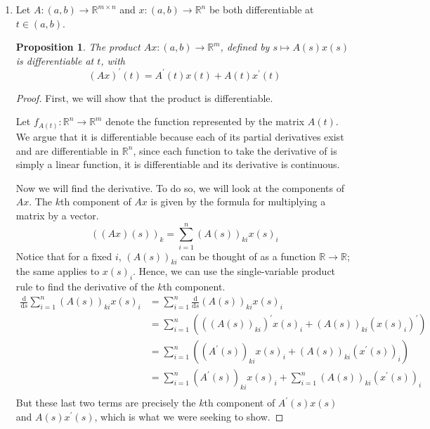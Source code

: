 \documentclass[letterpaper,11pt]{article}
\newtheorem{prop}{Proposition}
\newcommand{\R}{\mathbb{R}}
\renewcommand{\d}[1]{\frac{\text{d}}{\text{d}#1}}
\begin{document}
\begin{enumerate}
    \item Let $A : (a, b) \to \R^{m \times n}$ and $x : (a, b) \to \R^n$ be
        both differentiable at $t \in (a, b)$.

        \begin{prop}
            The product $Ax : (a, b) \to \R^m$, defined by $s \mapsto A(s)x(s)$
            is differentiable at $t$, with
            \begin{equation*}
                (Ax)^\prime (t) = A^\prime (t) x(t) + A(t) x^\prime (t)
            \end{equation*}
        \end{prop}

        \begin{proof}
            First, we will show that the product is differentiable.

            Let $f_{A(t)} : \R^n \to \R^m$ denote the function represented by
            the matrix $A(t)$. We argue that it is differentiable because each
            of its partial derivatives exist and are differentiable in $\R^n$,
            since each function to take the derivative of is simply a linear
            function, it is differentiable and its derivative is continuous.

            Now we will find the derivative. To do so, we will look at the
            components of $Ax$. The $k$th component of $Ax$ is given by the
            formula for multiplying a matrix by a vector.
            \begin{equation*}
                ((Ax)(s))_k = \sum_{i=1}^n (A(s))_{ki} x(s)_i
            \end{equation*}
            Notice that for a fixed $i$, $(A(s))_{ki}$ can be thought of as a
            function $\R \to \R$; the same applies to $x(s)_i$. Hence, we can
            use the single-variable product rule to find the derivative of the
            $k$th component.
            \begin{align*}
                \d{s} \sum_{i=1}^n (A(s))_{ki} x(s)_i
                &= \sum_{i=1}^n { \d{s} (A(s))_{ki} x(s)_i } \\
                &= \sum_{i=1}^n \left(
                    ((A(s))_{ki})^\prime x(s)_i + (A(s))_{ki} (x(s)_i)^\prime
                \right)\\
                &= \sum_{i=1}^n \left(
                    (A^\prime (s))_{ki} x(s)_i + (A(s))_{ki} (x^\prime (s))_i
                \right)\\
                &= \sum_{i=1}^n (A^\prime (s))_{ki} x(s)_i
                + \sum_{i=1}^n (A(s))_{ki} (x^\prime (s))_i \\
            \end{align*}
            But these last two terms are precisely the $k$th component of
            $A^\prime (s) x(s)$ and $A(s) x^\prime (s)$, which is what we were
            seeking to show.
        \end{proof}
\end{enumerate}
\end{document}

